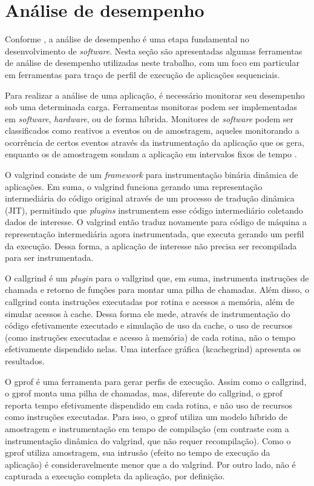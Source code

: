\documentclass[cic,tc]{iiufrgs}
\begin{document}
\section{Análise de desempenho}
\label{sec:antanal}

Conforme \cite{jain2art}, a análise de desempenho é uma etapa fundamental no
desenvolvimento de \textit{software}. Nesta seção são apresentadas algumas ferramentas
de análise de desempenho utilizadas neste trabalho, com um foco em particular
em ferramentas para traço de perfil de execução de aplicações sequenciais.

Para realizar a análise de uma aplicação, é necessário monitorar seu desempenho
sob uma determinada carga. Ferramentas monitoras podem ser implementadas em
\textit{software}, \textit{hardware}, ou de forma híbrida. Monitores de \textit{software} podem ser
classificados como reativos a eventos ou de amostragem, aqueles monitorando a
ocorrência de certos eventos através da instrumentação da aplicação que os
gera, enquanto os de amostragem sondam a aplicação em intervalos fixos de
tempo \cite{jain2art}.

O valgrind \cite{nethercote2007valgrind} consiste de um \textit{framework} para
instrumentação binária dinâmica de aplicações. Em suma, o valgrind funciona
gerando uma representação intermediária do código original através de um
processo de tradução dinâmica (JIT), permitindo que \textit{plugins} 
instrumentem esse código intermediário coletando dados de interesse. O valgrind
então traduz novamente para código de máquina a representação intermediária
agora instrumentada, que executa gerando um perfil da execução. Dessa forma, a
aplicação de interesse não precisa ser recompilada para ser instrumentada.

O callgrind \cite{weidendorfer2008sequential} é um \textit{plugin} para o
vallgrind que, em suma, instrumenta instruções de chamada e retorno de funções
para montar uma pilha de chamadas. Além disso, o callgrind conta instruções
executadas por rotina e acessos a memória, além de simular acessos à cache.
Dessa forma ele mede, através de instrumentação do código efetivamente
executado e simulação de uso da cache, o uso de recursos (como instruções
executadas e acesso à memória) de cada rotina, não o tempo efetivamente
dispendido nelas. Uma interface gráfica (kcachegrind) apresenta os resultados.

O gprof \cite{graham1982gprof} é uma ferramenta para gerar perfis de execução.
Assim como o callgrind, o gprof monta uma pilha de chamadas, mas, diferente do
callgrind, o gprof reporta tempo efetivamente dispendido em cada rotina, e não
uso de recursos como instruções executadas. Para isso, o gprof utiliza um
modelo híbrido de amostragem e instrumentação em tempo de compilação (em
contraste com a instrumentação dinâmica do valgrind, que não requer
recompilação). Como o gprof utiliza amostragem, sua intrusão (efeito no tempo
de execução da aplicação) é consideravelmente menor que a do valgrind. Por
outro lado, não é capturada a execução completa da aplicação, por definição.
\end{document}
